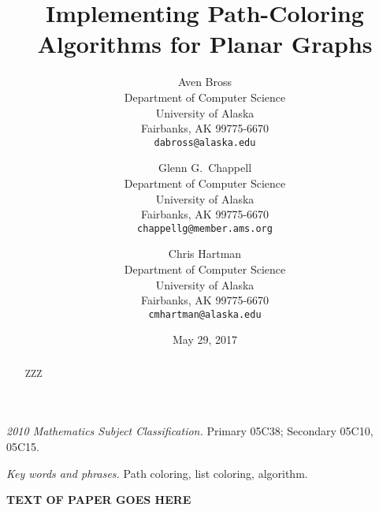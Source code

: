 \documentclass[12pt,letterpaper]{article}
\date{May 29, 2017}
\title{Implementing Path-Coloring Algorithms for Planar Graphs}
\author{Aven Bross\\
\small Department of Computer Science\\
\small University of Alaska\\
\small Fairbanks, AK 99775-6670\\
\small\texttt{dabross{@}alaska.edu} \and
Glenn G.~Chappell\\
\small Department of Computer Science\\
\small University of Alaska\\
\small Fairbanks, AK 99775-6670\\
\small\texttt{chappellg{@}member.ams.org} \and
Chris Hartman\\
\small Department of Computer Science\\
\small University of Alaska\\
\small Fairbanks, AK 99775-6670\\
\small\texttt{cmhartman{@}alaska.edu}}
\theoremstyle{plain}
\theoremstyle{definition}
\begin{document}
\maketitle
\centerline{\small \textit{2010 Mathematics Subject Classification.}
 Primary 05C38; Secondary 05C10, 05C15.}
\centerline{\small \textit{Key words and phrases.}
 Path coloring, list coloring, algorithm.}

\begin{abstract}
ZZZ
\end{abstract}


\textbf{TEXT OF PAPER GOES HERE} %
\end{document}
